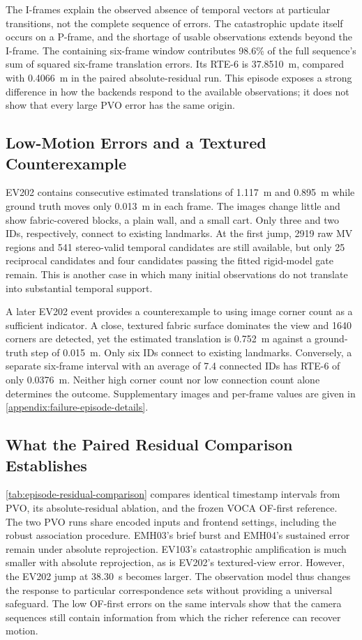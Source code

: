 The I-frames explain the observed absence of temporal vectors at particular
transitions, not the complete sequence of errors. The catastrophic update
itself occurs on a P-frame, and the shortage of usable observations extends
beyond the I-frame. The containing six-frame window contributes 98.6\% of
the full sequence's sum of squared six-frame translation errors. Its RTE-6 is
\SI{37.8510}{\metre}, compared with \SI{0.4066}{\metre} in the paired
absolute-residual run. This episode exposes a strong difference in how the
backends respond to the available observations; it does not show that every
large PVO error has the same origin.

\subsection{Low-Motion Errors and a Textured Counterexample}

EV202 contains consecutive estimated translations of \SI{1.117}{\metre} and
\SI{0.895}{\metre} while ground truth moves only \SI{0.013}{\metre} in each
frame. The images change little and show fabric-covered blocks, a plain wall,
and a small cart. Only three and two IDs, respectively, connect to existing
landmarks. At the first jump, 2919 raw MV regions and 541 stereo-valid temporal
candidates are still available, but only 25 reciprocal candidates and four
candidates passing the fitted rigid-model gate remain. This is another case
in which many initial observations do not translate into substantial temporal
support.

A later EV202 event provides a counterexample to using image corner count as a
sufficient indicator. A close, textured fabric surface dominates the view and
1640 corners are detected, yet the estimated translation is
\SI{0.752}{\metre} against a ground-truth step of \SI{0.015}{\metre}. Only six
IDs connect to existing landmarks. Conversely, a separate six-frame interval
with an average of 7.4 connected IDs has RTE-6 of only \SI{0.0376}{\metre}.
Neither high corner count nor low connection count alone determines the
outcome. Supplementary images and per-frame values are given in
\autoref{appendix:failure-episode-details}.

\subsection{What the Paired Residual Comparison Establishes}

\autoref{tab:episode-residual-comparison} compares identical timestamp
intervals from PVO, its absolute-residual ablation, and the frozen VOCA
OF-first reference. The two PVO runs share encoded inputs and frontend settings,
including the robust association procedure. EMH03's brief burst and EMH04's sustained error
remain under absolute reprojection. EV103's catastrophic amplification is much
smaller with absolute reprojection, as is EV202's textured-view error.
However, the EV202 jump at \SI{38.30}{\second} becomes larger. The observation
model thus changes the response to particular
correspondence sets without providing a universal safeguard. The low OF-first
errors on the same intervals show that the camera sequences still contain
information from which the richer reference can recover motion.

